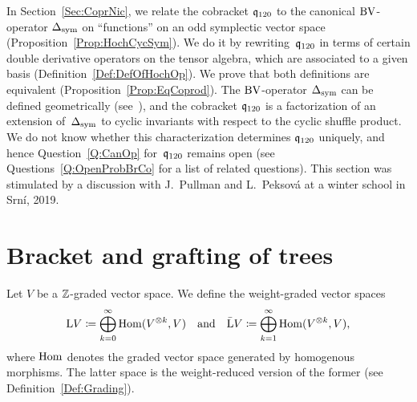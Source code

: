 \documentclass[\MainFolder/Text.tex]{subfiles}
\begin{document}
In Section~\ref{Sec:CoprNic}, we relate the cobracket $\mathfrak{q}_{120}$ to the canonical $\mathrm{BV}$-operator $\operatorname{\Delta}_{\mathrm{sym}}$ on ``functions'' on an odd symplectic vector space (Proposition~\ref{Prop:HochCycSym}). We do it by rewriting~$\mathfrak{q}_{120}$ in terms of certain double derivative operators on the tensor algebra, which are associated to a given basis (Definition~\ref{Def:DefOfHochOp}). We prove that both definitions are equivalent (Proposition~\ref{Prop:EqCoprod}). The $\mathrm{BV}$-operator $\operatorname{\Delta}_{\mathrm{sym}}$ can be defined geometrically (see~\cite{Doubek2018}), and the cobracket $\mathfrak{q}_{120}$ is a factorization of an extension of~$\operatorname{\Delta}_{\mathrm{sym}}$ to cyclic invariants with respect to the cyclic shuffle product. We do not know whether this characterization determines $\mathfrak{q}_{120}$ uniquely, and hence Question~\ref{Q:CanOp} for~$\mathfrak{q}_{120}$ remains open (see Questions~\ref{Q:OpenProbBrCo} for a list of related questions). This section was stimulated by a discussion with J.~Pullman and L.~Peksov\'a at a winter school in Srn\'i, 2019.%

\section{Bracket and grafting of trees}\label{Sec:LieBrHoch}

Let $V$ be a $\mathbb{Z}$-graded vector space. We define the weight-graded vector spaces
\begin{equation}\label{Eq:DefOfD}
\mathrm{L} V \coloneqq \bigoplus_{k=0}^\infty \mathrm{Hom}(V^{\otimes k},V)\quad\text{and}\quad \bar{\mathrm{L}} V \coloneqq \bigoplus_{k=1}^\infty \mathrm{Hom}(V^{\otimes k},V),
\end{equation}
where $\mathrm{Hom}$ denotes the graded vector space generated by homogenous morphisms. The latter space is the weight-reduced version of the former (see Definition~\ref{Def:Grading}).
\end{document}
